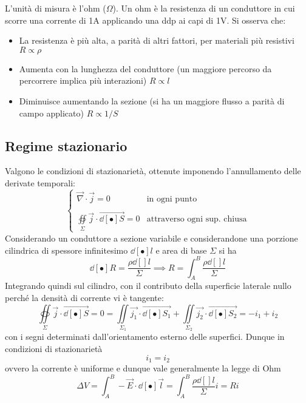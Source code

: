 
L'unità di misura è l'ohm ($\Omega$). Un ohm è la resistenza di un conduttore in cui scorre una corrente di 1A applicando una ddp ai capi di 1V. Si osserva che:
\begin{itemize}
\item La resistenza è più alta, a parità di altri fattori, per materiali più resistivi $R \propto \rho$
\item Aumenta con la lunghezza del conduttore (un maggiore percorso da percorrere implica più interazioni) $R \propto l$
\item Diminuisce aumentando la sezione (si ha un maggiore flusso a parità di campo applicato) $R \propto 1/S$
\end{itemize}

\subsection{Regime stazionario}
Valgono le condizioni di stazionarietà, ottenute imponendo l'annullamento delle derivate temporali:
\[
\begin{cases}
\vec{\nabla} \cdot \vec{j} = 0 & \textrm{in ogni punto}\\
\\
\oiint\limits_\Sigma \vec{j} \cdot \vec{\dd[•]{S}} = 0 & \textrm{attraverso ogni sup. chiusa}
\end{cases}
\]
Considerando un conduttore a sezione variabile e considerandone una porzione cilindrica di spessore infinitesimo $\dd[•]{l}$ e area di base $\Sigma$ si ha 
\[\dd[•]{R} = \frac{\rho \dd[]{l}}{\Sigma} \implies R = \int_A^B \frac{\rho \dd[]{l}}{\Sigma}\]
Integrando quindi sul cilindro, con il contributo della superficie laterale nullo perché la densità di corrente vi è tangente:
\[\oiint\limits_\Sigma \vec{j} \cdot \vec{\dd[•]{S}} = 0 = \iint\limits_{\Sigma_1} \vec{j_1} \cdot \vec{\dd[•]{S_1}} + \iint\limits_{\Sigma_2} \vec{j_2} \cdot \vec{\dd[•]{S_2}} = - i_1 + i_2\]
con i segni determinati dall'orientamento esterno delle superfici. Dunque in condizioni di stazionarietà
\[i_1 = i_2\]
ovvero la corrente è uniforme e dunque vale generalmente la legge di Ohm
\[\Delta V = \int_A^B - \vec{E} \cdot \dd[•]{\vec{l}} = \int_A^B \frac{\rho \dd[]{l}}{\Sigma} i = Ri\]

